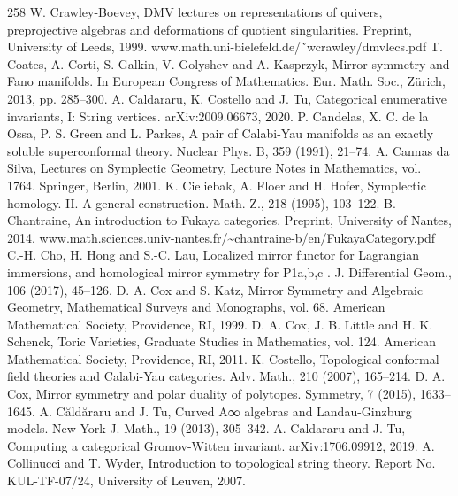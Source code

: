 \begin{thebibliography}{258}
\hypertarget{ref:48}{} W. Crawley-Boevey, DMV lectures on representations of quivers, preprojective algebras and deformations of quotient singularities. Preprint, University of Leeds, 1999. www.math.uni-bielefeld.de/˜wcrawley/dmvlecs.pdf
\hypertarget{ref:49}{} T. Coates, A. Corti, S. Galkin, V. Golyshev and A. Kasprzyk, Mirror symmetry and Fano manifolds. In European Congress of Mathematics. Eur. Math. Soc., Zürich, 2013, pp. 285–300.
\hypertarget{ref:50}{} A. Caldararu, K. Costello and J. Tu, Categorical enumerative invariants, I: String vertices. arXiv:2009.06673, 2020.
\hypertarget{ref:51}{} P. Candelas, X. C. de la Ossa, P. S. Green and L. Parkes, A pair of Calabi-Yau manifolds as an exactly soluble superconformal theory. Nuclear Phys. B, 359 (1991), 21–74.
\hypertarget{ref:52}{} A. Cannas da Silva, Lectures on Symplectic Geometry, Lecture Notes in Mathematics, vol. 1764. Springer, Berlin, 2001.
\hypertarget{ref:53}{} K. Cieliebak, A. Floer and H. Hofer, Symplectic homology. II. A general construction. Math. Z., 218 (1995), 103–122.
\hypertarget{ref:54}{} B. Chantraine, An introduction to Fukaya categories. Preprint, University of Nantes, 2014. \url{www.math.sciences.univ-nantes.fr/~chantraine-b/en/FukayaCategory.pdf}
\hypertarget{ref:55}{} C.-H. Cho, H. Hong and S.-C. Lau, Localized mirror functor for Lagrangian immersions, and homological mirror symmetry for P1a,b,c . J. Differential Geom., 106 (2017), 45–126.
\hypertarget{ref:56}{} D. A. Cox and S. Katz, Mirror Symmetry and Algebraic Geometry, Mathematical Surveys and Monographs, vol. 68. American Mathematical Society, Providence, RI, 1999.
\hypertarget{ref:57}{} D. A. Cox, J. B. Little and H. K. Schenck, Toric Varieties, Graduate Studies in Mathematics, vol. 124. American Mathematical Society, Providence, RI, 2011.
\hypertarget{ref:58}{} K. Costello, Topological conformal field theories and Calabi-Yau categories. Adv. Math., 210 (2007), 165–214.
\hypertarget{ref:59}{} D. A. Cox, Mirror symmetry and polar duality of polytopes. Symmetry, 7 (2015), 1633–1645.
\hypertarget{ref:60}{} A. Căldăraru and J. Tu, Curved A∞ algebras and Landau-Ginzburg models. New York J. Math., 19 (2013), 305–342.
\hypertarget{ref:61}{} A. Caldararu and J. Tu, Computing a categorical Gromov-Witten invariant. arXiv:1706.09912, 2019.
\hypertarget{ref:62}{} A. Collinucci and T. Wyder, Introduction to topological string theory. Report No. KUL-TF-07/24, University of Leuven, 2007.

\end{thebibliography}
